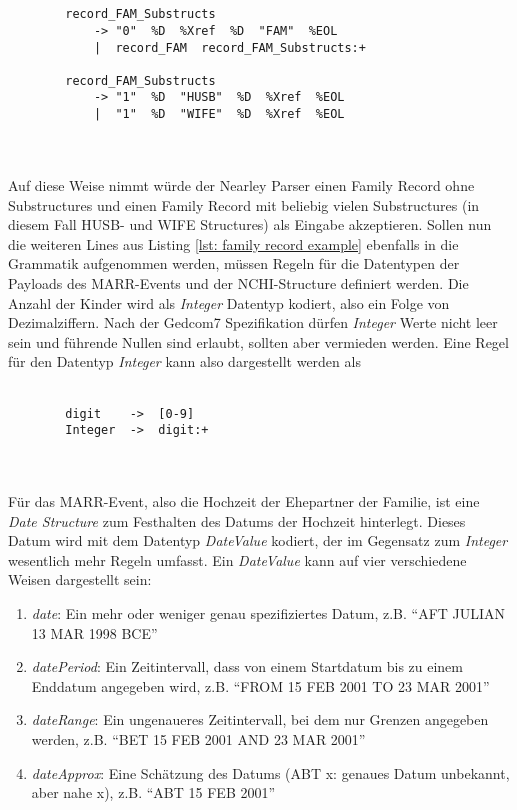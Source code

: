 \\ \\
\begin{minipage}{1.0\textwidth} \small
	\begin{lstlisting}
		record_FAM_Substructs
			-> "0"  %D  %Xref  %D  "FAM"  %EOL 
			|  record_FAM  record_FAM_Substructs:+
		
		record_FAM_Substructs 
			-> "1"  %D  "HUSB"  %D  %Xref  %EOL
			|  "1"  %D  "WIFE"  %D  %Xref  %EOL 
	\end{lstlisting}
	\label{lst: nearley regel family record with husb and wife}
\end{minipage}
\\ \\
Auf diese Weise nimmt würde der Nearley Parser einen Family Record ohne Substructures und einen Family Record mit beliebig vielen Substructures (in diesem Fall HUSB- und WIFE Structures) als Eingabe akzeptieren. Sollen nun die weiteren Lines aus Listing \ref{lst: family record example} ebenfalls in die Grammatik aufgenommen werden, müssen Regeln für die Datentypen der Payloads des MARR-Events und der NCHI-Structure definiert werden. Die Anzahl der Kinder wird als  \textit{Integer} Datentyp kodiert, also ein Folge von Dezimalziffern. Nach der Gedcom7 Spezifikation dürfen \textit{Integer} Werte nicht leer sein und führende Nullen sind erlaubt, sollten aber vermieden werden. Eine Regel für den Datentyp \textit{Integer} kann also dargestellt werden als
\\ \\
\begin{minipage}{1.0\textwidth} \small
	\begin{lstlisting}
		digit    ->  [0-9]
		Integer  ->  digit:+
	\end{lstlisting}
	\label{lst: nearley regel integer}
\end{minipage}
\\ \\ 
Für das MARR-Event, also die Hochzeit der Ehepartner der Familie, ist eine \textit{Date Structure} zum Festhalten des Datums der Hochzeit hinterlegt. Dieses Datum wird mit dem Datentyp \textit{DateValue} kodiert, der im Gegensatz zum \textit{Integer} wesentlich mehr Regeln umfasst. Ein \textit{DateValue} kann auf vier verschiedene Weisen dargestellt sein:
\begin{enumerate}
	\item \textit{date}: Ein mehr oder weniger genau spezifiziertes Datum, z.B. ``AFT JULIAN 13 MAR 1998 BCE''
	\item \textit{datePeriod}: Ein Zeitintervall, dass von einem Startdatum bis zu einem Enddatum angegeben wird, z.B. ``FROM 15 FEB 2001 TO 23 MAR 2001''
	\item \textit{dateRange}: Ein ungenaueres Zeitintervall, bei dem nur Grenzen angegeben werden, z.B. ``BET 15 FEB 2001 AND 23 MAR 2001''
	\item \textit{dateApprox}: Eine Schätzung des Datums (ABT x: genaues Datum unbekannt, aber nahe x), z.B. ``ABT 15 FEB 2001''
\end{enumerate}
